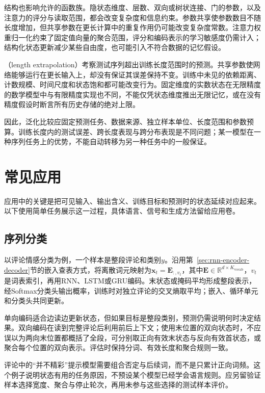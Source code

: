 结构也影响允许的函数族。隐状态维度、层数、双向或树状连接、门的参数，以及注意力的评分与读取范围，都会改变复杂度和信息约束。参数共享使参数数目不随长度增加，但共享参数在更长计算中的重复作用仍可能改变复杂度常数。注意力权重归一化约束了固定值向量的聚合范围，评分和编码表示的学习敏感度仍需计入；结构化状态更新减少某些自由度，也可能引入不符合数据的记忆假设。

（length extrapolation）考察测试序列超出训练长度范围时的预测。共享参数使网络能够运行在更长输入上，却没有保证其误差保持不变。训练中未见的依赖距离、计数规模、时间尺度和状态饱和都可能改变行为。固定维度的实数状态在无限精度的数学模型中与有限精度实现也不同，不能仅凭状态维度推出无限记忆，或在没有精度假设时断言所有历史存储的绝对上限。

因此，泛化比较应固定预测任务、数据来源、独立样本单位、长度范围和参数预算。训练长度内的测试误差、跨长度表现与跨分布表现是不同问题；某一模型在一种序列任务上的优势，不能自动转移为另一种任务中的一般保证。

\section{常见应用}
\label{sec:rnn-applications}

应用中的关键是把可见输入、输出含义、训练目标和预测时的状态延续对应起来。以下使用简单任务展示这一过程，具体语言、信号和生成方法留给应用卷。

\subsection{序列分类}
\label{sec:rnn-application-classification}

以评论情感分类为例，一个样本是整段评论和类别$y$。沿用第~\ref{sec:rnn-encoder-decoder}节的嵌入查表方式，将离散词元映射为$\bm{x}_t=\bm{E}_{:,v_t}$，其中$\bm{E}\in\mathbb{R}^{d\times K_{\mathrm{vocab}}}$，$v_t$是词表索引，再用RNN、LSTM或GRU编码。末状态或掩码平均形成整段表示，经Softmax分类头输出概率，训练时对独立评论的交叉熵取平均；嵌入、循环单元和分类头共同更新。

单向编码适合边读边更新状态，但如果目标是整段类别，预测仍需说明何时决定结果。双向编码在读到完整评论后利用前后上下文；使用末位置的双向状态时，不应误以为两向末位置都概括了全段，可分别取正向有效末状态与反向有效首状态，或聚合每个位置的双向表示。评估时保持分词、有效长度和聚合规则一致。

评论中的“并不精彩”提示模型需要组合否定与后续词，而不是只累计正向词频。这个例子说明状态有用的任务原因，不预设某个模型已经学会语言规则。应另留验证样本选择宽度、聚合与停止轮次，再用未参与这些选择的测试样本评价。

